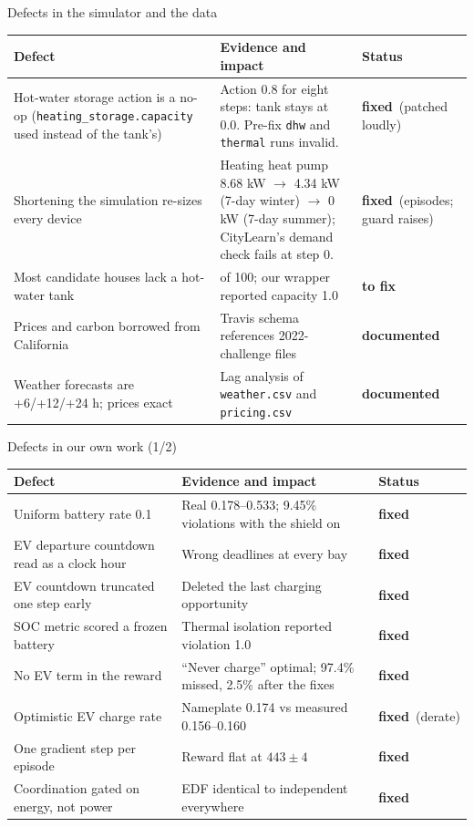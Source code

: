 \documentclass[aspectratio=169,10pt]{beamer}
\newcommand{\tagok}{\textcolor{stemsgreen}{\textbf{fixed}}}
\newcommand{\tagtodo}{\textcolor{stemsred}{\textbf{to fix}}}
\newcommand{\tagdoc}{\textcolor{stemsorange}{\textbf{documented}}}
\begin{document}
\begin{frame}{Defects in the simulator and the data}
\small
\begin{tabularx}{\textwidth}{@{}>{\raggedright\arraybackslash}p{4.3cm}>{\raggedright\arraybackslash}X>{\raggedright\arraybackslash}p{2.1cm}@{}}
\toprule
Defect & Evidence and impact & Status \\
\midrule
Hot-water storage action is a no-op (\texttt{heating\_storage.capacity} used instead of the tank's) & Action 0.8 for eight steps: tank stays at 0.0. Pre-fix \texttt{dhw} and \texttt{thermal} runs invalid. & \tagok\ (patched loudly) \\
Shortening the simulation re-sizes every device & Heating heat pump 8.68 kW $\rightarrow$ 4.34 kW (7-day winter) $\rightarrow$ 0 kW (7-day summer); CityLearn's demand check fails at step 0. & \tagok\ (episodes; guard raises) \\
Most candidate houses lack a hot-water tank & 61 of 100; our wrapper reported capacity 1.0 & \tagtodo \\
Prices and carbon borrowed from California & Travis schema references 2022-challenge files & \tagdoc \\
Weather forecasts are +6/+12/+24 h; prices exact & Lag analysis of \texttt{weather.csv} and \texttt{pricing.csv} & \tagdoc \\
\bottomrule
\end{tabularx}
\end{frame}

\begin{frame}{Defects in our own work (1/2)}
\small
\begin{tabularx}{\textwidth}{@{}>{\raggedright\arraybackslash}p{4.3cm}>{\raggedright\arraybackslash}X>{\raggedright\arraybackslash}p{2.1cm}@{}}
\toprule
Defect & Evidence and impact & Status \\
\midrule
Uniform battery rate 0.1 & Real 0.178--0.533; 9.45\% violations with the shield on & \tagok \\
EV departure countdown read as a clock hour & Wrong deadlines at every bay & \tagok \\
EV countdown truncated one step early & Deleted the last charging opportunity & \tagok \\
SOC metric scored a frozen battery & Thermal isolation reported violation 1.0 & \tagok \\
No EV term in the reward & ``Never charge'' optimal; 97.4\% missed, 2.5\% after the fixes & \tagok \\
Optimistic EV charge rate & Nameplate 0.174 vs measured 0.156--0.160 & \tagok\ (derate) \\
One gradient step per episode & Reward flat at $443 \pm 4$ & \tagok \\
Coordination gated on energy, not power & EDF identical to independent everywhere & \tagok \\
\bottomrule
\end{tabularx}
\end{frame}
\end{document}
